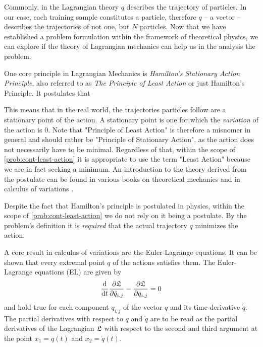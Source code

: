 Commonly, in the Lagrangian theory $q$ describes the trajectory of particles.
In our case, each training sample constitutes a particle, therefore $q$ -- a vector -- describes the trajectories of not one, but $N$ particles. 
Now that we have established a problem formulation within the framework of theoretical physics, we can explore if the theory of Lagrangian mechanics can help us in the analysis the problem.

One core principle in Lagrangian Mechanics is \emph{Hamilton's Stationary Action Principle}, also referred to as \emph{The Principle of Least Action} or just Hamilton's Principle.
It postulates that\vspace{.5em}
\newline
{}

This means that in the real world, the trajectories particles follow are a stationary point of the action.
A stationary point is one for which the \emph{variation} of the action is $0$.
Note that "Principle of Least Action" is therefore a misnomer in general and should rather be "Principle of Stationary Action", as the action does not necessarily have to be minimal.
Regardless of that, within the scope of \cref{prob:cont-least-action} it is appropriate to use the term "Least Action" because we are in fact seeking a minimum.
An introduction to the theory derived from the postulate can be found in various books on theoretical mechanics \cite{goldstein01, marsden10, feynman63} and in calculus of variations \cite{kielhofer18}.

Despite the fact that Hamilton's principle is postulated in physics, within the scope of \cref{prob:cont-least-action} we do not rely on it being a postulate.
By the problem's definition it is \emph{required} that the actual trajectory $q$ minimizes the action.

A core result in calculus of variations are the Euler-Lagrange equations.
It can be shown that every extremal point $q$ of the actions satisfies them.
The Euler-Lagrange equations (EL) are given by
\begin{equation}
\frac{\mathrm{d}}{\mathrm{d}t} \frac{\partial \mathfrak{L}}{\partial \dot{q}_{i, j}} - \frac{\partial \mathfrak{L}}{\partial q_{i, j}} = 0
\end{equation}
and hold true for each component $q_{i, j}$ of the vector $q$ and its time-derivative $\dot{q}$.
The partial derivatives with respect to $q$ and $\dot{q}$ are to be read as the partial derivatives of the Lagrangian $\mathfrak{L}$ with respect to the second and third argument at the point $x_1 = q(t)$ and $x_2 = \dot{q}(t)$.

